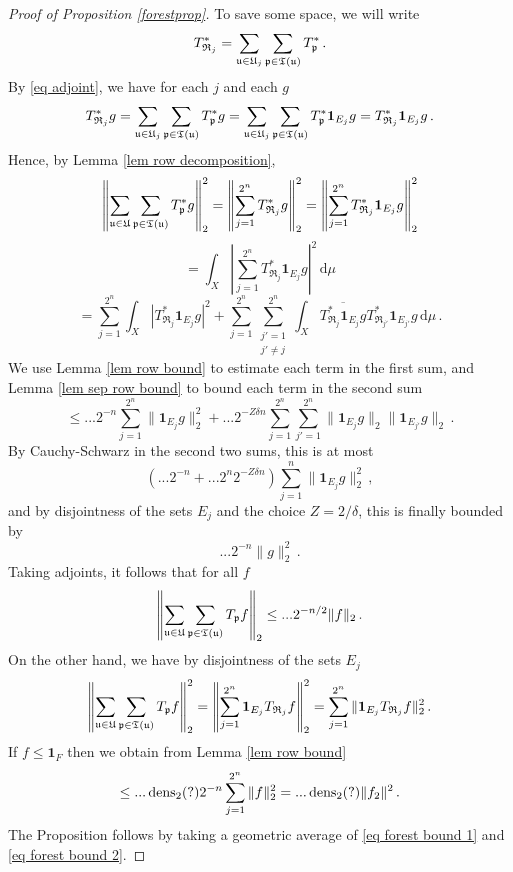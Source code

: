 \begin{proof}[Proof of Proposition \ref{forestprop}]
    To save some space, we will write
    $$
        T_{\mathfrak{R}_j}^* = \sum_{\mathfrak u \in \mathfrak U_j} \sum_{\mathfrak p \in \mathfrak T(\mathfrak u)} T_{\mathfrak p}^*\,.
    $$
    By \eqref{eq adjoint}, we have for each $j$ and each $g$
    $$
        T_{\mathfrak{R}_j}^*g = \sum_{\mathfrak u \in \mathfrak U_j} \sum_{\mathfrak p \in \mathfrak T(\mathfrak u)} T_{\mathfrak p}^* g = \sum_{\mathfrak u \in \mathfrak U_j} \sum_{\mathfrak p \in \mathfrak T(\mathfrak u)} T_{\mathfrak p}^* \mathbf{1}_{E_j} g = T_{\mathfrak{R}_j}^* \mathbf{1}_{E_j} g\,.
    $$
    Hence, by Lemma \ref{lem row decomposition},
    $$
        \left\|\sum_{\mathfrak u \in \mathfrak U} \sum_{\mathfrak p \in \mathfrak T(\mathfrak u)} T^*_{\mathfrak p} g\right\|_2^2 = \left\|\sum_{j = 1}^{2^n} T^*_{\mathfrak{R}_{j}} g\right\|_2^2  =  \left\|\sum_{j=1}^{2^n} T^*_{\mathfrak{R}_{j}} \mathbf{1}_{E_j} g\right\|_2^2
    $$
    $$
        = \int_X \left|\sum_{j=1}^{2^n} T^*_{\mathfrak{R}_{j}} \mathbf{1}_{E_j} g\right|^2 \, \mathrm{d}\mu
    $$
    $$
        = \sum_{j=1}^{2^n} \int_X |T_{\mathfrak{R}_j}^* \mathbf{1}_{E_j} g|^2 + \sum_{j =1}^{2^n} \sum_{\substack{j' = 1\\j' \ne j}}^{2^n} \int_X \overline{ T_{\mathfrak{R}_j}^* \mathbf{1}_{E_j} g} T_{\mathfrak{R}_{j'}}^* \mathbf{1}_{E_{j'}} g \, \mathrm{d}\mu\,.
    $$
    We use Lemma \ref{lem row bound} to estimate each term in the first sum, and Lemma \ref{lem sep row bound} to bound each term in the second sum
    $$
        \le ...  2^{-n} \sum_{j = 1}^{2^n} \|\mathbf{1}_{E_j} g\|_2^2 + ... 2^{-Z\delta n}\sum_{j=1}^{2^n}\sum_{j' = 1}^{2^n} \|\mathbf{1}_{E_j} g\|_2 \|\mathbf{1}_{E_{j'}}g\|_2\,.
    $$
    By Cauchy-Schwarz in the second two sums, this is at most
    $$
        (... 2^{-n} + ... 2^{n}2^{-Z\delta n}) \sum_{j = 1}^n \|\mathbf{1}_{E_j} g\|_2^2\,,
    $$
    and by disjointness of the sets $E_j$ and the choice $Z = 2/\delta$, this is finally bounded by
    $$
        ... 2^{-n} \|g\|_2^2\,.
    $$
    Taking adjoints, it follows that for all $f$
    \begin{equation}
        \label{eq forest bound 1}
        \left\|\sum_{\mathfrak u \in \mathfrak U} \sum_{\mathfrak p \in \mathfrak T(\mathfrak u)} T_{\mathfrak p} f\right\|_2 \le ... 2^{-n/2} \|f\|_2\,.
    \end{equation}
    On the other hand, we have by disjointness of the sets $E_j$
    $$
        \left\|\sum_{\mathfrak u \in \mathfrak U} \sum_{\mathfrak p \in \mathfrak T(\mathfrak u)} T_{\mathfrak p} f\right\|_2^2 =  \left\|\sum_{j=1}^{2^n} \mathbf{1}_{E_j} T_{\mathfrak{R}_{j}} f\right\|_2^2 = \sum_{j = 1}^{2^n} \|\mathbf{1}_{E_j} T_{\mathfrak{R}_{j}} f\|_2^2\,.
    $$
    If $f \le \mathbf{1}_F$ then we obtain from Lemma \ref{lem row bound}
    \begin{equation}
        \label{eq forest bound 2}
        \le ... \operatorname{\operatorname{dens}}_2(?) 2^{-n} \sum_{j = 1}^{2^n} \|f\|_2^2
        = ... \operatorname{\operatorname{dens}}_2(?) \|f_2\|^2\,.
    \end{equation}
    The Proposition follows by taking a geometric average of \eqref{eq forest bound 1} and \eqref{eq forest bound 2}.
\end{proof}

